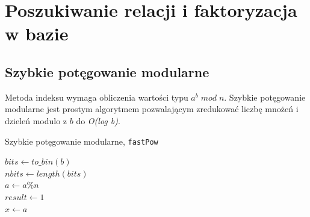 \documentclass[]{article}
\begin{document}
\newpage
\section{Poszukiwanie relacji i faktoryzacja w bazie}
	\subsection{Szybkie potęgowanie modularne}
	Metoda indeksu wymaga obliczenia wartości typu $a^{b}\;{mod}\;n$.
	Szybkie potęgowanie modularne jest prostym algorytmem pozwalającym zredukować liczbę mnożeń i dzieleń modulo z $b$ do \textit{O(log b)}.
	\newline
	\begin{algorithm}[H]
		\caption{Szybkie potęgowanie modularne,  \texttt{fastPow}} 
		\label{szybkie_pot} 
		\BlankLine
		$bits \gets to\_bin(b)$\\
		$nbits \gets length(bits)$\\
		$a \gets a\%n$\\
		$result \gets 1$\\
		$x \gets a$\\
	\end{algorithm}
\end{document}
